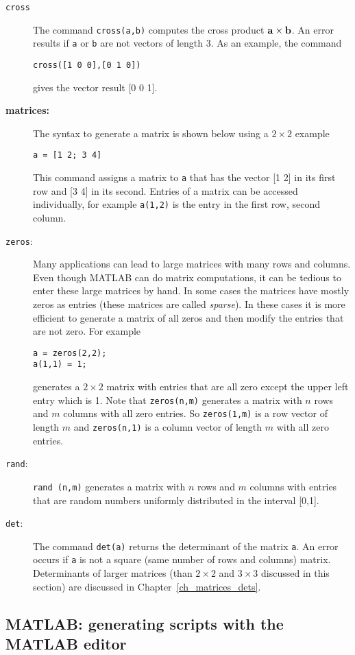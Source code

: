 \begin{description}
\item[{\tt cross}] The command {\tt cross(a,b)} computes the cross 
product ${\bf a} \times {\bf b}$. An error results if {\tt a} or {\tt b} are not 
vectors of length 3. As an example, the command
\begin{verbatim}
cross([1 0 0],[0 1 0])
\end{verbatim} 
gives the vector result [0 0 1]. 
\item[{\bf matrices:}] The syntax to generate a matrix is shown below using 
a $2 \times 2$ example
\begin{verbatim}
a = [1 2; 3 4]
\end{verbatim}
This command assigns a matrix to {\tt a} that has the vector [1 2] in its 
first row and [3 4] in its second. Entries of a matrix can be accessed 
individually, for example {\tt a(1,2)} is the entry in the first row, 
second column. 
\item[{\tt zeros}:] Many applications can lead to large 
matrices with many rows and columns. Even though MATLAB can do matrix 
computations, it can be tedious to enter these large matrices by hand. 
In some cases the matrices have mostly zeros as entries (these matrices 
are called {\em sparse}). In these cases it is more efficient to generate 
a matrix of all zeros and then modify the entries that are not zero. 
For example 
\begin{verbatim}
a = zeros(2,2);
a(1,1) = 1;
\end{verbatim}
generates a $2 \times 2$ matrix with entries that are all zero except the 
upper left entry which is 1. Note that {\tt zeros(n,m)} generates a 
matrix with $n$ rows and $m$ columns with all zero entries. 
So {\tt zeros(1,m)} is a row vector of length $m$ and {\tt zeros(n,1)}
is a column vector of length $m$ with all zero entries. 
\item[{\tt rand}:] {\tt rand (n,m)} generates a 
matrix with $n$ rows and $m$ columns with entries that are random numbers 
uniformly distributed in the interval [0,1].  
\item[{\tt det}:] The command {\tt det(a)} returns the determinant 
of the matrix {\tt a}. An error occurs if {\tt a} is not 
a square (same number of rows and columns) matrix. Determinants of 
larger matrices (than $2 \times 2$ and $3 \times 3$ discussed in this
section) are discussed in Chapter~\ref{ch_matrices_dets}.
\end{description}

\subsection{MATLAB: generating scripts with the MATLAB editor}

